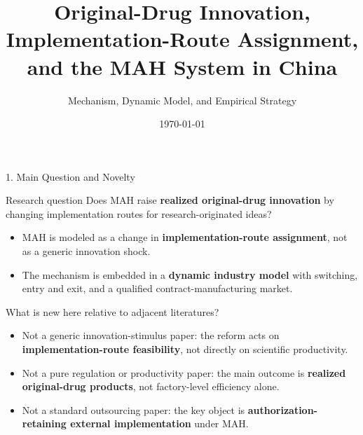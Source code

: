 \documentclass[aspectratio=169,11pt]{beamer}
\title[Original-Drug Innovation and MAH]{Original-Drug Innovation, Implementation-Route Assignment,\\ and the MAH System in China}
\subtitle{Mechanism, Dynamic Model, and Empirical Strategy}
\date{\today}
\begin{document}
\begin{frame}
\titlepage
\end{frame}

\begin{frame}{1. Main Question and Novelty}
\footnotesize
\begin{block}{Research question}
Does MAH raise \textbf{realized original-drug innovation} by changing implementation routes for research-originated ideas?
\end{block}

\begin{itemize}
\item MAH is modeled as a change in \textbf{implementation-route assignment}, not as a generic innovation shock.
\item The mechanism is embedded in a \textbf{dynamic industry model} with switching, entry and exit, and a qualified contract-manufacturing market.
\end{itemize}

\begin{block}{What is new here relative to adjacent literatures?}
\begin{itemize}
\item Not a generic innovation-stimulus paper: the reform acts on \textbf{implementation-route feasibility}, not directly on scientific productivity.
\item Not a pure regulation or productivity paper: the main outcome is \textbf{realized original-drug products}, not factory-level efficiency alone.
\item Not a standard outsourcing paper: the key object is \textbf{authorization-retaining external implementation} under MAH.
\end{itemize}
\end{block}
\end{frame}
\end{document}

